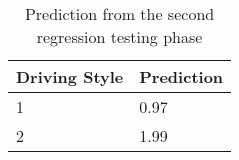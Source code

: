 \begin{table}[H]
\centering
\begin{tabular}{|l|l|}
\hline
\textbf{Driving Style} & \textbf{Prediction} \\ \hline
1                      & 0.97                \\ \hline
2                      & 1.99                \\ \hline
\end{tabular}
\caption{Prediction from the second regression testing phase}
\label{tab:prediction2}
\end{table}





